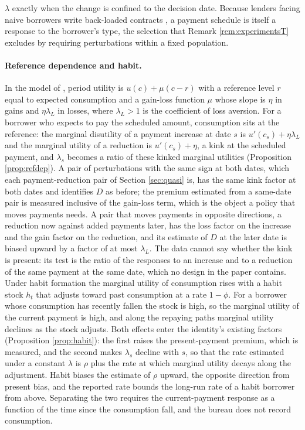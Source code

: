 \documentclass[12pt,english]{article}
\begin{document}
$\lambda$ exactly when the change is confined to the decision date. Because lenders facing naive borrowers write back-loaded contracts \citep{heidhues_exploiting_2010}, a payment schedule is itself a response to the borrower's type, the selection that Remark \ref{rem:experimentsT} excludes by requiring perturbations within a fixed population.

\paragraph{Reference dependence and habit.} In the model of \citet{koszegi_model_2006, koszegi_reference-dependent_2009}, period utility is $u(c) + \mu(c - r)$ with a reference level $r$ equal to expected consumption and a gain-loss function $\mu$ whose slope is $\eta$ in gains and $\eta\lambda_L$ in losses, where $\lambda_L > 1$ is the coefficient of loss aversion. For a borrower who expects to pay the scheduled amount, consumption sits at the reference: the marginal disutility of a payment increase at date $s$ is $u'(c_s) + \eta\lambda_L$ and the marginal utility of a reduction is $u'(c_s) + \eta$, a kink at the scheduled payment, and $\lambda_s$ becomes a ratio of these kinked marginal utilities (Proposition \ref{prop:refdep}). A pair of perturbations with the same sign at both dates, which each payment-reduction pair of Section \ref{sec:quasi} is, has the same kink factor at both dates and identifies $D$ as before; the premium estimated from a same-date pair is measured inclusive of the gain-loss term, which is the object a policy that moves payments needs. A pair that moves payments in opposite directions, a reduction now against added payments later, has the loss factor on the increase and the gain factor on the reduction, and its estimate of $D$ at the later date is biased upward by a factor of at most $\lambda_L$. The data cannot say whether the kink is present: its test is the ratio of the responses to an increase and to a reduction of the same payment at the same date, which no design in the paper contains. Under habit formation \citep{constantinides_habit_1990, campbell_force_1999} the marginal utility of consumption rises with a habit stock $h_t$ that adjusts toward past consumption at a rate $1-\phi$. For a borrower whose consumption has recently fallen the stock is high, so the marginal utility of the current payment is high, and along the repaying paths marginal utility declines as the stock adjusts. Both effects enter the identity's existing factors (Proposition \ref{prop:habit}): the first raises the present-payment premium, which is measured, and the second makes $\lambda_s$ decline with $s$, so that the rate estimated under a constant $\lambda$ is $\rho$ plus the rate at which marginal utility decays along the adjustment. Habit biases the estimate of $\rho$ upward, the opposite direction from present bias, and the reported rate bounds the long-run rate of a habit borrower from above. Separating the two requires the current-payment response as a function of the time since the consumption fall, and the bureau does not record consumption.
\end{document}
